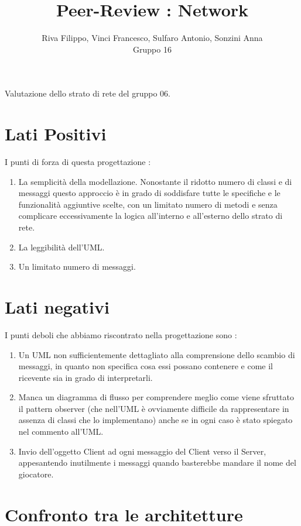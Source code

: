\documentclass[12pt]{article}
\title{Peer-Review : Network}
\author{Riva Filippo, Vinci Francesco, Sulfaro Antonio, Sonzini Anna\\Gruppo 16}
\begin{document}
\maketitle

Valutazione dello strato di rete del gruppo 06.

\section{Lati Positivi}

I punti di forza di questa progettazione :
\begin{enumerate}
    \item La semplicità della modellazione. Nonostante il ridotto numero di classi e di messaggi questo approccio è in grado di soddisfare tutte le specifiche e le funzionalità aggiuntive scelte, con un limitato numero di metodi e senza complicare eccessivamente la logica all'interno e all'esterno dello strato di rete.
    \item La leggibilità dell'UML. 
    \item Un limitato numero di messaggi. 
\end{enumerate}

\section{Lati negativi}

I punti deboli che abbiamo riscontrato nella progettazione sono : 
\begin{enumerate}
    \item Un UML non sufficientemente dettagliato alla comprensione dello scambio di messaggi, in quanto non specifica cosa essi possano contenere e come il ricevente sia in grado di interpretarli. 
    \item Manca un diagramma di flusso per comprendere meglio come viene sfruttato il pattern observer (che nell'UML è ovviamente difficile da rappresentare in assenza di classi che lo implementano) anche se in ogni caso è stato spiegato nel commento all'UML.
    \item Invio dell'oggetto Client ad ogni messaggio del Client verso il Server, appesantendo inutilmente i messaggi quando basterebbe mandare il nome del giocatore.
\end{enumerate}

\section{Confronto tra le architetture}
\end{document}

